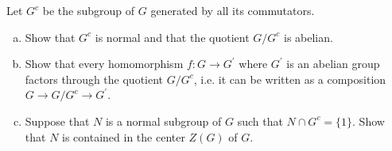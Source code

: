 \documentclass{article}
\newcounter{Problem}
\newenvironment{Problem}{\begin{Exercise}[name={Problem},
                                          counter={Problem}]}
                        {\end{Exercise}}
\begin{document}
\pagebreak

\begin{Problem}
Let $G^c$ be the subgroup of $G$ generated by all its commutators.

\begin{enumerate}[(a)]
  \item{Show that $G^c$ is normal and that the quotient $G / G^c$ is
        abelian.}
  \item{Show that every homomorphism $f : G \to G^\prime$ where
      $G^\prime$ is an abelian group factors through the quotient 
      $G / G^c$, i.e. it can be written as a composition
      $G \to G / G^c \to G^\prime$.}
  \item{Suppose that $N$ is a normal subgroup of $G$ such that
      $N \cap G^c = \{ 1 \}$. Show that $N$ is contained in the center
      $Z(G)$ of $G$.}
\end{enumerate}
\end{Problem}
\end{document}
